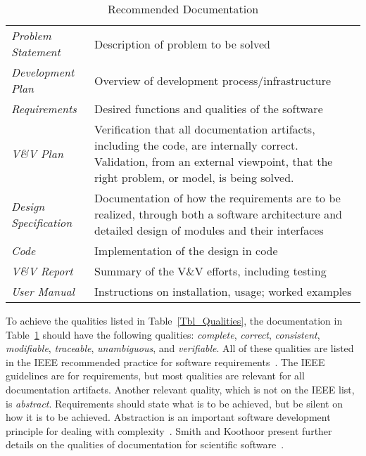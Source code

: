 \documentclass[12pt]{article}
\begin{document}
\begin{table}[!h]
  \caption{Recommended Documentation} \label{TblDocuments}
  
  \begin{tabular}{l p{8cm}}
    \textit{Problem Statement} & Description of problem to be solved\\
    \textit{Development Plan} & Overview of development process/infrastructure\\
    \textit{Requirements} & Desired functions and qualities of the software\\
    \textit{V\&V Plan} & Verification that all documentation artifacts,
                           including the code, are internally correct.
                           Validation, from an external viewpoint, that the right
                           problem, or model, is being solved.\\
    \textit{Design Specification} & Documentation of how the requirements are to
                                    be realized, through both a software
                                    architecture and detailed design of modules
                                    and their interfaces\\
    \textit{Code} & Implementation of the design in code\\
    \textit{V\&V Report} & Summary of the V\&V efforts,
                             including testing\\
    \textit{User Manual} & Instructions on installation, usage; worked examples\\
  \end{tabular}
\end{table}

To achieve the qualities listed in Table~\ref{Tbl_Qualities}, the documentation
in Table~\ref{TblDocuments} should have the following qualities:
\emph{complete}, \emph{correct}, \emph{consistent}, \emph{modifiable},
\emph{traceable}, \emph{unambiguous}, and \emph{verifiable}.  All of these
qualities are listed in the IEEE recommended practice for software
requirements~\cite{IEEE1998}.  The IEEE guidelines are for requirements, but
most qualities are relevant for all documentation artifacts.  Another relevant
quality, which is not on the IEEE list, is \emph{abstract}.  Requirements should
state what is to be achieved, but be silent on how it is to be achieved.
Abstraction is an important software development principle for dealing with
complexity~\cite[p.~40]{GhezziEtAl2003}.  Smith and Koothoor present further
details on the qualities of documentation for scientific
software~\cite{SmithAndKoothoor2016}.
\end{document}
